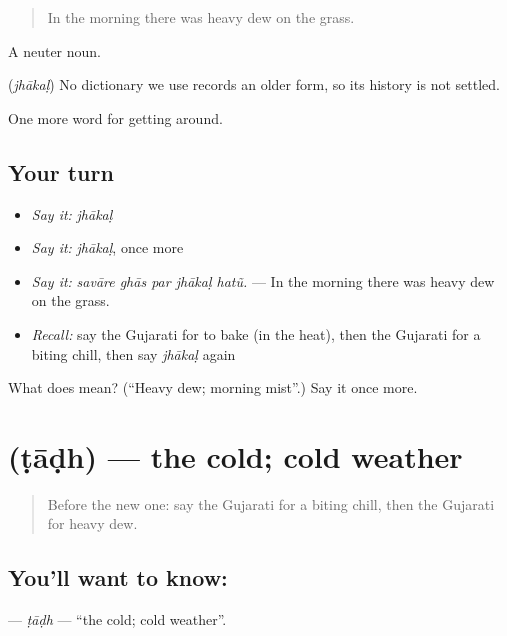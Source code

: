 \begin{quote}
In the morning there was heavy dew on the grass.
\end{quote}

A neuter noun.

\begin{cousinweb}
\textbf{} (\emph{jhākaḷ}) No dictionary we use records an older form, so its history is not settled.
\end{cousinweb}

\begin{grammarlens}[title={What you've built}]
One more word for getting around.
\end{grammarlens}

\subsection*{Your turn}
\begin{itemize}
\raggedright
  \item \emph{Say it:} \emph{jhākaḷ}
  \item \emph{Say it:} \emph{jhākaḷ}, once more
  \item \emph{Say it:} \emph{savāre ghās par jhākaḷ hatũ.} — In the morning there was heavy dew on the grass.
  \item \emph{Recall:} say the Gujarati for to bake (in the heat), then the Gujarati for a biting chill, then say \emph{jhākaḷ} again
\end{itemize}

\begin{tcolorbox}[breakable,colback=teal!4,colframe=teal!35!black,title={Before you move on}]
What does  mean? (\textquotedblleft{}Heavy dew; morning mist\textquotedblright{}.) Say it once more.
\end{tcolorbox}
\section[\texorpdfstring{\gu{ટાઢ} (ṭāḍh)}{ટાઢ (ṭāḍh)}]{ (ṭāḍh) — the cold; cold weather}

\label{lesson:GU-C437-tadh}



\begin{quote}
Before the new one: say the Gujarati for a biting chill, then the Gujarati for heavy dew.
\end{quote}

\subsection*{You'll want to know: }
\textbf{} — \emph{ṭāḍh} — \textquotedblleft{}the cold; cold weather\textquotedblright{}.

